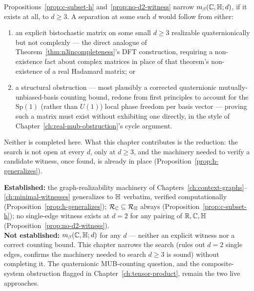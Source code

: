 \begin{remark}
\label{rem:gap-isolated}
Propositions~\ref{prop:c-subset-h} and~\ref{prop:no-d2-witness} narrow
$m_\beta(\mathbb{C},\mathbb{H};d)$, if it exists at all, to $d\ge3$. A separation at
some such $d$ would follow from either:
\begin{enumerate}
\item[(i)] an explicit bistochastic matrix on some small $d\ge3$ realizable
quaternionically but not complexly — the direct analogue of
Theorem~\ref{thm:n3incompleteness}'s DFT construction, requiring a
non-existence fact about complex matrices in place of that theorem's
non-existence of a real Hadamard matrix; or
\item[(ii)] a structural obstruction — most plausibly a corrected
quaternionic mutually-unbiased-basis counting bound, redone from first
principles to account for the $\mathrm{Sp}(1)$ (rather than $U(1)$) local
phase freedom per basis vector — proving such a matrix must exist without
exhibiting one directly, in the style of
Chapter~\ref{ch:real-mub-obstruction}'s cycle argument.
\end{enumerate}
Neither is completed here. What this chapter contributes is the
reduction: the search is not open at every $d$, only at $d\ge3$, and the
machinery needed to verify a candidate witness, once found, is already in
place (Proposition~\ref{prop:h-generalizes}).
\end{remark}

\begin{ledgerentry}
\textbf{Established:} the graph-realizability machinery of
Chapters~\ref{ch:context-graphs}--\ref{ch:minimal-witnesses} generalizes to
$\mathbb{H}$ verbatim, verified computationally
(Proposition~\ref{prop:h-generalizes}); $\mathcal R_{\mathbb{C}} \subseteq \mathcal
R_{\mathbb{H}}$ always (Proposition~\ref{prop:c-subset-h}); no single-edge witness
exists at $d=2$ for any pairing of $\mathbb{R},\mathbb{C},\mathbb{H}$
(Proposition~\ref{prop:no-d2-witness}).\\
\textbf{Not established:} $m_\beta(\mathbb{C},\mathbb{H};d)$ for any $d$ — neither an
explicit witness nor a correct counting bound. This chapter narrows the
search (rules out $d=2$ single edges, confirms the machinery needed to
search $d\ge3$ is sound) without completing it. The quaternionic
MUB-counting question, and the composite-system obstruction flagged in
Chapter~\ref{ch:tensor-product}, remain the two live approaches.
\end{ledgerentry}
